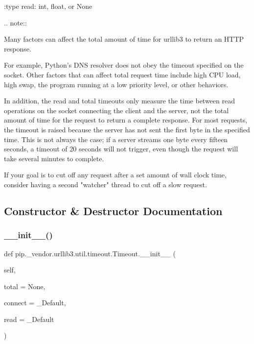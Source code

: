 \begin{DoxyVerb}
:type read: int, float, or None

.. note::

    Many factors can affect the total amount of time for urllib3 to return
    an HTTP response.

    For example, Python's DNS resolver does not obey the timeout specified
    on the socket. Other factors that can affect total request time include
    high CPU load, high swap, the program running at a low priority level,
    or other behaviors.

    In addition, the read and total timeouts only measure the time between
    read operations on the socket connecting the client and the server,
    not the total amount of time for the request to return a complete
    response. For most requests, the timeout is raised because the server
    has not sent the first byte in the specified time. This is not always
    the case; if a server streams one byte every fifteen seconds, a timeout
    of 20 seconds will not trigger, even though the request will take
    several minutes to complete.

    If your goal is to cut off any request after a set amount of wall clock
    time, consider having a second "watcher" thread to cut off a slow
    request.
\end{DoxyVerb}
 

\subsection{Constructor \& Destructor Documentation}
\mbox{\label{classpip_1_1__vendor_1_1urllib3_1_1util_1_1timeout_1_1Timeout_a95d7bf91164983c9b8e92e818bc42eb5}} 
\subsubsection{\texorpdfstring{\+\_\+\+\_\+init\+\_\+\+\_\+()}{\_\_init\_\_()}}
{\footnotesize\ttfamily def pip.\+\_\+vendor.\+urllib3.\+util.\+timeout.\+Timeout.\+\_\+\+\_\+init\+\_\+\+\_\+ (\begin{DoxyParamCaption}\item[{}]{self,  }\item[{}]{total = {\ttfamily None},  }\item[{}]{connect = {\ttfamily \+\_\+Default},  }\item[{}]{read = {\ttfamily \+\_\+Default} }\end{DoxyParamCaption})}



